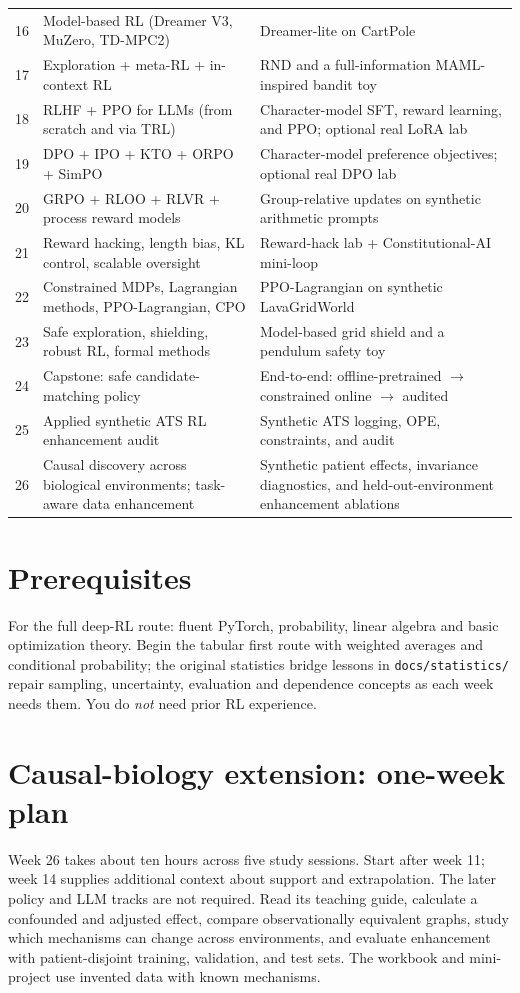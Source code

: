 \documentclass[11pt,oneside]{scrbook}
\begin{document}
\begin{longtable}{@{}p{1.4cm}p{6.4cm}p{6.0cm}@{}}
16 & Model-based RL (Dreamer V3, MuZero, TD-MPC2) & Dreamer-lite on CartPole \\
17 & Exploration + meta-RL + in-context RL & RND and a full-information MAML-inspired bandit toy \\
18 & RLHF + PPO for LLMs (from scratch and via TRL) & Character-model SFT, reward learning, and PPO; optional real LoRA lab \\
19 & DPO + IPO + KTO + ORPO + SimPO & Character-model preference objectives; optional real DPO lab \\
20 & GRPO + RLOO + RLVR + process reward models & Group-relative updates on synthetic arithmetic prompts \\
21 & Reward hacking, length bias, KL control, scalable oversight & Reward-hack lab + Constitutional-AI mini-loop \\
22 & Constrained MDPs, Lagrangian methods, PPO-Lagrangian, CPO & PPO-Lagrangian on synthetic LavaGridWorld \\
23 & Safe exploration, shielding, robust RL, formal methods & Model-based grid shield and a pendulum safety toy \\
24 & Capstone: safe candidate-matching policy & End-to-end: offline-pretrained $\to$ constrained online $\to$ audited \\
25 & Applied synthetic ATS RL enhancement audit & Synthetic ATS logging, OPE, constraints, and audit \\
26 & Causal discovery across biological environments; task-aware data enhancement & Synthetic patient effects, invariance diagnostics, and held-out-environment enhancement ablations \\
\bottomrule
\end{longtable}

\section{Prerequisites}
For the full deep-RL route: fluent PyTorch, probability, linear algebra and basic optimization theory. Begin the tabular first route with weighted averages and conditional probability; the original statistics bridge lessons in \texttt{docs/statistics/} repair sampling, uncertainty, evaluation and dependence concepts as each week needs them.
You do \emph{not} need prior RL experience.

\section{Causal-biology extension: one-week plan}
Week 26 takes about ten hours across five study sessions. Start after week 11;
week 14 supplies additional context about support and extrapolation. The later
policy and LLM tracks are not required. Read its teaching guide, calculate a
confounded and adjusted effect, compare observationally equivalent graphs,
study which mechanisms can change across environments, and evaluate enhancement
with patient-disjoint training, validation, and test sets. The workbook and
mini-project use invented data with known mechanisms.
\end{document}
